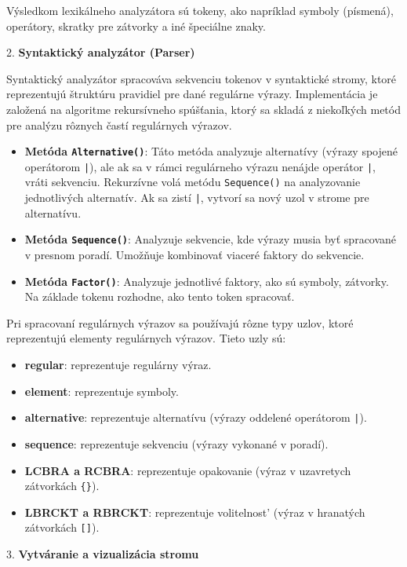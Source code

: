 \documentclass[a4paper,12pt]{article}
\begin{document}
Výsledkom lexikálneho analyzátora sú tokeny, ako napríklad symboly (písmená), operátory, skratky pre zátvorky a iné špeciálne znaky.

2. \textbf{Syntaktický analyzátor (Parser)}

Syntaktický analyzátor spracováva sekvenciu tokenov v syntaktické stromy, ktoré reprezentujú štruktúru pravidiel pre dané regulárne výrazy. Implementácia je založená na algoritme rekursívneho spúšťania, ktorý sa skladá z niekoľkých metód pre analýzu rôznych častí regulárnych výrazov.

\begin{itemize}
     \item \textbf{Metóda \texttt{Alternative()}}: Táto metóda analyzuje alternatívy (výrazy spojené operátorom \texttt{|}), ale ak sa v rámci regulárneho výrazu nenájde operátor \texttt{|}, vráti sekvenciu. Rekurzívne volá metódu \texttt{Sequence()} na analyzovanie jednotlivých alternatív. Ak sa zistí \texttt{|}, vytvorí sa nový uzol v strome pre alternatívu.
    \item \textbf{Metóda \texttt{Sequence()}}: Analyzuje sekvencie, kde výrazy musia byť spracované v presnom poradí. Umožňuje kombinovať viaceré faktory do sekvencie.
    \item \textbf{Metóda \texttt{Factor()}}: Analyzuje jednotlivé faktory, ako sú symboly, zátvorky. Na základe tokenu rozhodne, ako tento token spracovať.
\end{itemize}

Pri spracovaní regulárnych výrazov sa používajú rôzne typy uzlov, ktoré reprezentujú elementy regulárnych výrazov. Tieto uzly sú:
\begin{itemize}
    \item \textbf{regular}: reprezentuje regulárny výraz.
    \item \textbf{element}: reprezentuje symboly.
    \item \textbf{alternative}: reprezentuje alternatívu (výrazy oddelené operátorom \texttt{|}).
    \item \textbf{sequence}: reprezentuje sekvenciu (výrazy vykonané v poradí).
    \item \textbf{LCBRA a RCBRA}:  reprezentuje opakovanie (výraz v uzavretych zátvorkách \texttt{\{\}}).
    \item \textbf{LBRCKT a RBRCKT}: reprezentuje volitelnost' (výraz v hranatých zátvorkách \texttt{[]}).
\end{itemize}

3. \textbf{Vytváranie a vizualizácia stromu}
\end{document}
